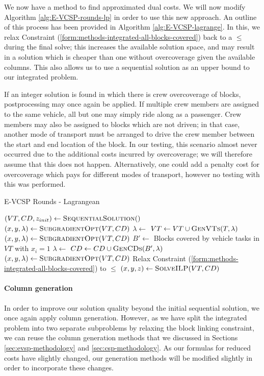 \documentclass[]{article}
\begin{document}
We now have a method to find approximated dual costs. We will now modify Algorithm \ref{alg:E-VCSP-rounds-lp} in order to use this new approach. An outline of this process has been provided in Algorithm \ref{alg:E-VCSP-lagrange}. In this, we relax Constraint (\ref{form:methods-integrated-all-blocks-covered}) back to a $\leq$ during the final solve; this increases the available solution space, and may result in a solution which is cheaper than one without overcoverage given the available columns. This also allows us to use a sequential solution as an upper bound to our integrated problem.

If an integer solution is found in which there is crew overcoverage of blocks, postprocessing may once again be applied. If multiple crew members are assigned to the same vehicle, all but one may simply ride along as a passenger. Crew members may also be assigned to blocks which are not driven; in that case, another mode of transport must be arranged to drive the crew member between the start and end location of the block. In our testing, this scenario almost never occurred due to the additional costs incurred by overcoverage; we will therefore assume that this does not happen. Alternatively, one could add a penalty cost for overcoverage which pays for different modes of transport, however no testing with this was performed.

\begin{algorithm}
\caption{E-VCSP Rounds - Lagrangean}\label{alg:E-VCSP-lagrange}
\begin{algorithmic}
\State $(VT, CD, z_{init}) \gets \Call{SequentialSolution}$
\State $(x, y, \lambda) \gets \Call{SubgradientOpt}{VT, CD}$
    \State $\lambda \gets$ 
    \State $VT \gets VT \cup \Call{GenVTs}{T, \lambda}$
    \State $(x, y, \lambda) \gets \Call{SubgradientOpt}{VT, CD}$
  \EndFor
    \State $B' \gets$ Blocks covered by vehicle tasks in $VT$ with $x_i = 1$
    \State $\lambda \gets$ 
    \State $CD \gets CD \cup \Call{GenCDs}{B', \lambda}$
    \State $(x, y, \lambda) \gets \Call{SubgradientOpt}{VT, CD}$
  \EndFor
\EndWhile
\State Relax Constraint (\ref{form:methods-integrated-all-blocks-covered}) to $\leq$
\State $(x, y, z) \gets \Call{SolveILP}{VT, CD}$
\end{algorithmic}
\end{algorithm}

\paragraph{Column generation} \label{sec:evcsp-cg}
In order to improve our solution quality beyond the initial sequential solution, we once again apply column generation. However, as we have split the integrated problem into two separate subproblems by relaxing the block linking constraint, we can reuse the column generation methods that we discussed in Sections \ref{sec:evsp-methodology} and \ref{sec:csp-methodology}. As our formulas for reduced costs have slightly changed, our generation methods will be modified slightly in order to incorporate these changes.
\end{document}
